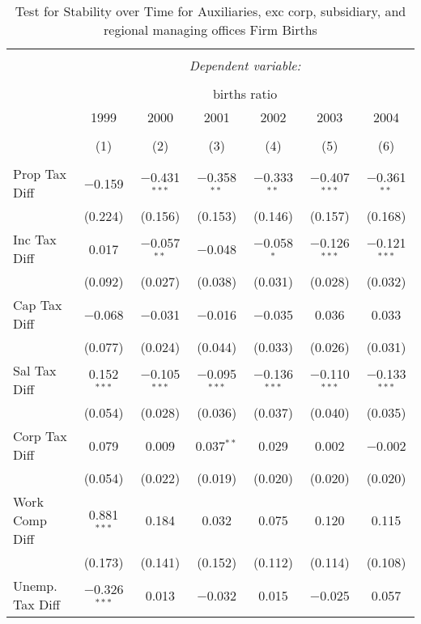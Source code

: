 
\begin{table}[!htbp] \centering 
  \caption{Test for Stability over Time for  Auxiliaries, exc corp, subsidiary, and regional managing offices Firm Births} 
  \label{95year} 
\small 
\begin{tabular}{@{\extracolsep{5pt}}lcccccc} 
\\[-1.8ex]\hline 
\hline \\[-1.8ex] 
 & \multicolumn{6}{c}{\textit{Dependent variable:}} \\ 
\cline{2-7} 
\\[-1.8ex] & \multicolumn{6}{c}{births ratio} \\ 
 & 1999 & 2000 & 2001 & 2002 & 2003 & 2004 \\ 
\\[-1.8ex] & (1) & (2) & (3) & (4) & (5) & (6)\\ 
\hline \\[-1.8ex] 
 Prop Tax Diff & $-$0.159 & $-$0.431$^{***}$ & $-$0.358$^{**}$ & $-$0.333$^{**}$ & $-$0.407$^{***}$ & $-$0.361$^{**}$ \\ 
  & (0.224) & (0.156) & (0.153) & (0.146) & (0.157) & (0.168) \\ 
  Inc Tax Diff & 0.017 & $-$0.057$^{**}$ & $-$0.048 & $-$0.058$^{*}$ & $-$0.126$^{***}$ & $-$0.121$^{***}$ \\ 
  & (0.092) & (0.027) & (0.038) & (0.031) & (0.028) & (0.032) \\ 
  Cap Tax Diff & $-$0.068 & $-$0.031 & $-$0.016 & $-$0.035 & 0.036 & 0.033 \\ 
  & (0.077) & (0.024) & (0.044) & (0.033) & (0.026) & (0.031) \\ 
  Sal Tax Diff & 0.152$^{***}$ & $-$0.105$^{***}$ & $-$0.095$^{***}$ & $-$0.136$^{***}$ & $-$0.110$^{***}$ & $-$0.133$^{***}$ \\ 
  & (0.054) & (0.028) & (0.036) & (0.037) & (0.040) & (0.035) \\ 
  Corp Tax Diff & 0.079 & 0.009 & 0.037$^{**}$ & 0.029 & 0.002 & $-$0.002 \\ 
  & (0.054) & (0.022) & (0.019) & (0.020) & (0.020) & (0.020) \\ 
  Work Comp Diff & 0.881$^{***}$ & 0.184 & 0.032 & 0.075 & 0.120 & 0.115 \\ 
  & (0.173) & (0.141) & (0.152) & (0.112) & (0.114) & (0.108) \\ 
  Unemp. Tax Diff & $-$0.326$^{***}$ & 0.013 & $-$0.032 & 0.015 & $-$0.025 & 0.057 \\ 

\end{tabular}
\end{table}
